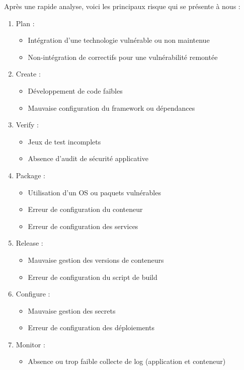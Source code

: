 Après une rapide analyse, voici les principaux risque qui se présente à nous :
\begin{multicols}{2}
    \begin{enumerate}
        \item Plan :
        \begin{itemize}
            \item Intégration d'une technologie vulnérable ou non maintenue
            \item Non-intégration de correctifs pour une vulnérabilité remontée
        \end{itemize}
        \item Create :
        \begin{itemize}
            \item Développement de code faïbles
            \item Mauvaise configuration du framework ou dépendances
        \end{itemize}
        \item Verify :
        \begin{itemize}
            \item Jeux de test incomplets
            \item Absence d'audit de sécurité applicative
        \end{itemize}
        \item Package :
        \begin{itemize}
            \item Utilisation d'un OS ou paquets vulnérables
            \columnbreak
            \item Erreur de configuration du conteneur
            \item Erreur de configuration des services
        \end{itemize}
        \item Release :
        \begin{itemize}
            \item Mauvaise gestion des versions de conteneurs
            \item Erreur de configuration du script de build
        \end{itemize}
        \item Configure :
        \begin{itemize}
            \item Mauvaise gestion des secrets
            \item Erreur de configuration des déploiements
        \end{itemize}
        \item Monitor :
        \begin{itemize}
            \item Absence ou trop faible collecte de log (application et conteneur)
        \end{itemize}
    \end{enumerate}
\end{multicols}

